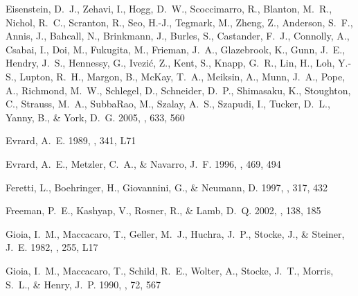 \documentclass[apj]{emulateapj}
\begin{document}
\begin{thebibliography}{}
{Eisenstein}, D.~J., {Zehavi}, I., {Hogg}, D.~W., {Scoccimarro}, R., {Blanton},
  M.~R., {Nichol}, R.~C., {Scranton}, R., {Seo}, H.-J., {Tegmark}, M., {Zheng},
  Z., {Anderson}, S.~F., {Annis}, J., {Bahcall}, N., {Brinkmann}, J., {Burles},
  S., {Castander}, F.~J., {Connolly}, A., {Csabai}, I., {Doi}, M., {Fukugita},
  M., {Frieman}, J.~A., {Glazebrook}, K., {Gunn}, J.~E., {Hendry}, J.~S.,
  {Hennessy}, G., {Ivezi{\'c}}, Z., {Kent}, S., {Knapp}, G.~R., {Lin}, H.,
  {Loh}, Y.-S., {Lupton}, R.~H., {Margon}, B., {McKay}, T.~A., {Meiksin}, A.,
  {Munn}, J.~A., {Pope}, A., {Richmond}, M.~W., {Schlegel}, D., {Schneider},
  D.~P., {Shimasaku}, K., {Stoughton}, C., {Strauss}, M.~A., {SubbaRao}, M.,
  {Szalay}, A.~S., {Szapudi}, I., {Tucker}, D.~L., {Yanny}, B., \& {York},
  D.~G. 2005, \apj, 633, 560

{Evrard}, A.~E. 1989, \apjl, 341, L71

{Evrard}, A.~E., {Metzler}, C.~A., \& {Navarro}, J.~F. 1996, \apj, 469, 494

{Feretti}, L., {Boehringer}, H., {Giovannini}, G., \& {Neumann}, D. 1997, \aap,
  317, 432

{Freeman}, P.~E., {Kashyap}, V., {Rosner}, R., \& {Lamb}, D.~Q. 2002, \apjs,
  138, 185

{Gioia}, I.~M., {Maccacaro}, T., {Geller}, M.~J., {Huchra}, J.~P., {Stocke},
  J., \& {Steiner}, J.~E. 1982, \apjl, 255, L17

{Gioia}, I.~M., {Maccacaro}, T., {Schild}, R.~E., {Wolter}, A., {Stocke},
  J.~T., {Morris}, S.~L., \& {Henry}, J.~P. 1990, \apjs, 72, 567


\end{thebibliography}
\end{document}

